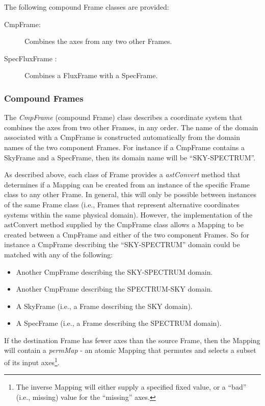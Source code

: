 \documentclass[final,authoryear,5p,times,twocolumn]{elsarticle}
\begin{document}
The following compound Frame classes are provided:

\begin{description}
\item[CmpFrame:] Combines the axes from any two other Frames.
\item[SpecFluxFrame :] Combines a FluxFrame with a SpecFrame.
\end{description}

\subsubsection{Compound Frames}
The \emph{CmpFrame} (compound Frame) class describes a coordinate system
that combines the axes from two other Frames, in any order. The name of
the domain associated with a CmpFrame is constructed automatically from
the domain names of the two component Frames. For instance if a CmpFrame
contains a SkyFrame and a SpecFrame, then its domain name will be
``SKY-SPECTRUM''.

As described above, each class of Frame provides a \emph{astConvert} method
that determines if a Mapping can be created from an instance of the specific
Frame class to any other Frame. In general, this will only be possible
between instances of the same Frame class (i.e., Frames that represent
alternative coordinates systems within the same physical domain).
However, the implementation of the astConvert method supplied by the
CmpFrame class allows a Mapping to be created between a CmpFrame and
either of the two component Frames. So for instance a CmpFrame describing
the ``SKY-SPECTRUM'' domain could be matched with any of the following:

\begin{itemize}
\item Another CmpFrame describing the SKY-SPECTRUM domain.
\item Another CmpFrame describing the SPECTRUM-SKY domain.
\item A SkyFrame (i.e., a Frame describing the SKY domain).
\item A SpecFrame (i.e., a Frame describing the SPECTRUM domain).
\end{itemize}

If the destination Frame has fewer axes than the source Frame, then the
Mapping will contain a \emph{permMap} - an atomic Mapping that permutes
and selects a subset of its input axes\footnote{The inverse Mapping will
either supply a specified fixed value, or a ``bad'' (i.e., missing) value
for the ``missing'' axes.}.
\end{document}
